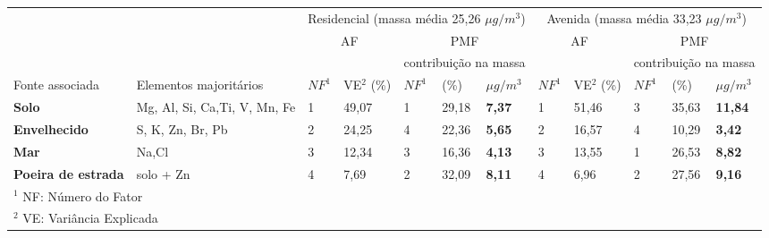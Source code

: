 \begin{tabular}{llll|lll|ll|lll}
\hline
                                                  &                        & \multicolumn{5}{c|}{Residencial (massa média 25,26 $\mu g / m^3$)} & \multicolumn{5}{c}{Avenida (massa média 33,23 $\mu g / m^3$)}    \\
                                                  &                        & \multicolumn{2}{c}{AF}      & \multicolumn{3}{c|}{PMF}              & \multicolumn{2}{c}{AF}                    & \multicolumn{3}{c}{PMF}          \\
\hline
 & & & & \multicolumn{3}{c|}{contribuição na massa} & & & \multicolumn{3}{c}{contribuição na massa} \\
Fonte associada                                   & Elementos majoritários & $NF^1$   & VE$^2$ (\%)               & $NF^1$   & (\%)   & $\mu g / m^3$  & $NF^1$       & VE$^2$  (\%)            & $NF^1$ & (\%)  & $\mu g / m^3$ \\
\hline
\textbf{Solo}                                                    & Mg, Al, Si, Ca,Ti, V, Mn, Fe & 1  & 49,07               & 1      & 29,18 & \textbf{7,37} & 1  & 51,46               & 3      & 35,63 & \textbf{11,84} \\
\textbf{Envelhecido} & S, K, Zn, Br, Pb             & 2  & 24,25               & 4      & 22,36 & \textbf{5,65} & 2  & 16,57               & 4      & 10,29 & \textbf{3,42}  \\
\textbf{Mar}                                                     & Na,Cl                        & 3  & 12,34               & 3      & 16,36 & \textbf{4,13} & 3  & 13,55               & 1      & 26,53 & \textbf{8,82}  \\
\textbf{Poeira de estrada}                                       & solo + Zn                       & 4  & 7,69                & 2      & 32,09 & \textbf{8,11} & 4  & 6,96                & 2      & 27,56 & \textbf{9,16}   \\ 

\hline
\multicolumn{12}{l}{$^1$ NF: Número do Fator} \\
\multicolumn{12}{l}{$^2$ VE: Variância Explicada} \\
\hline
\end{tabular}
